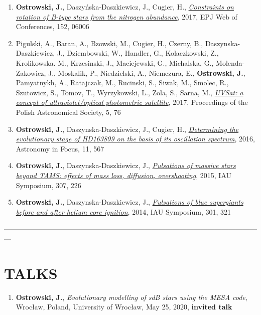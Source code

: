 \documentclass[margin, 10pt]{res} %
\begin{document}
\begin{resume}
\begin{enumerate}
    \item \textbf{Ostrowski, J.}, Daszy\'{n}ska-Daszkiewicz, J., Cugier, H., \href{http://adsabs.harvard.edu/abs/2017EPJWC.15206006O}{\textit{Constraints on rotation of B-type stars from the nitrogen abundance}}, 2017, EPJ Web of Conferences, 152, 06006

    \item Pigulski, A., Baran, A., Bzowski, M., Cugier, H., Czerny, B., Daszynska-Daszkiewicz, J., Dziembowski, W.,  Handler, G., Kolaczkowski, Z., Krolikowska. M., Krzesinski, J., Maciejewski, G., Michalska, G., Molenda-Zakowicz, J., Moskalik, P., Niedzielski, A., Niemczura, E., \textbf{Ostrowski, J.}, Pamyatnykh, A., Ratajczak, M., Rucinski, S., Siwak, M., Smolec, R., Szutowicz, S., Tomov, T., Wyrzykowski, L., Zola, S., Sarna, M., \href{http://adsabs.harvard.edu/abs/2017sbcs.conf...76P}{\textit{UVSat: a concept of ultraviolet/optical photometric satellite}}, 2017, Proceedings of the Polish Astronomical Society, 5, 76

    \item \textbf{Ostrowski, J.}, Daszynska-Daszkiewicz, J., Cugier, H., \href{http://adsabs.harvard.edu/abs/2016IAUFM..29B.567O}{\textit{Determining the evolutionary stage of HD163899 on the basis of its oscillation spectrum}}, 2016, Astronomy in Focus, 11, 567

    \item \textbf{Ostrowski, J.}, Daszynska-Daszkiewicz, J., \href{http://adsabs.harvard.edu/abs/2015IAUS..307..226O}{\textit{Pulsations of massive stars beyond TAMS: effects of mass loss, diffusion, overshooting}}, 2015, IAU Symposium, 307, 226

    \item \textbf{Ostrowski, J.}, Daszynska-Daszkiewicz, J., \href{http://adsabs.harvard.edu/abs/2014IAUS..301..321O}{\textit{Pulsations of blue supergiants before and after helium core ignition}}, 2014, IAU Symposium, 301, 321
\end{enumerate}

---------------------------------------------------------------------------------------------------------------

\section{TALKS}

\begin{enumerate}
    \item \textbf{Ostrowski, J.}, \textit{Evolutionary modelling of sdB stars using the MESA code}, Wroc\l{}aw, Poland, University of Wroc\l{}aw, May 25, 2020, \textbf{invited talk}


\end{enumerate}
\end{resume}
\end{document}
